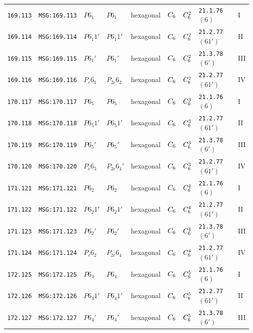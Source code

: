 \documentclass[fleqn,10pt]{jsarticle}
\begin{document}
\begin{center}
\begin{longtable}{lllllllll}
\texttt{169.113} & \texttt{MSG:169.113} & $P6_{1}$ & $P6_{1}$ & hexagonal & $C_{\rm 6}$ & $C_{\rm 6}^{2}$ & \texttt{21.1.76} $(6)$ & I \\
\texttt{169.114} & \texttt{MSG:169.114} & $P6_{1}1'$ & $P6_{1}1'$ & hexagonal & $C_{\rm 6}$ & $C_{\rm 6}^{2}$ & \texttt{21.2.77} $(61')$ & II \\
\texttt{169.115} & \texttt{MSG:169.115} & $P6_{1}'$ & $P6_{1}'$ & hexagonal & $C_{\rm 6}$ & $C_{\rm 6}^{2}$ & \texttt{21.3.78} $(6')$ & III \\
\texttt{169.116} & \texttt{MSG:169.116} & $P_{c}6_{1}$ & $P_{2c}6_{2}$ & hexagonal & $C_{\rm 6}$ & $C_{\rm 6}^{2}$ & \texttt{21.2.77} $(61')$ & IV \\ \hline
\texttt{170.117} & \texttt{MSG:170.117} & $P6_{5}$ & $P6_{5}$ & hexagonal & $C_{\rm 6}$ & $C_{\rm 6}^{3}$ & \texttt{21.1.76} $(6)$ & I \\
\texttt{170.118} & \texttt{MSG:170.118} & $P6_{5}1'$ & $P6_{5}1'$ & hexagonal & $C_{\rm 6}$ & $C_{\rm 6}^{3}$ & \texttt{21.2.77} $(61')$ & II \\
\texttt{170.119} & \texttt{MSG:170.119} & $P6_{5}'$ & $P6_{5}'$ & hexagonal & $C_{\rm 6}$ & $C_{\rm 6}^{3}$ & \texttt{21.3.78} $(6')$ & III \\
\texttt{170.120} & \texttt{MSG:170.120} & $P_{c}6_{5}$ & $P_{2c}6_{4}'$ & hexagonal & $C_{\rm 6}$ & $C_{\rm 6}^{3}$ & \texttt{21.2.77} $(61')$ & IV \\ \hline
\texttt{171.121} & \texttt{MSG:171.121} & $P6_{2}$ & $P6_{2}$ & hexagonal & $C_{\rm 6}$ & $C_{\rm 6}^{4}$ & \texttt{21.1.76} $(6)$ & I \\
\texttt{171.122} & \texttt{MSG:171.122} & $P6_{2}1'$ & $P6_{2}1'$ & hexagonal & $C_{\rm 6}$ & $C_{\rm 6}^{4}$ & \texttt{21.2.77} $(61')$ & II \\
\texttt{171.123} & \texttt{MSG:171.123} & $P6_{2}'$ & $P6_{2}'$ & hexagonal & $C_{\rm 6}$ & $C_{\rm 6}^{4}$ & \texttt{21.3.78} $(6')$ & III \\
\texttt{171.124} & \texttt{MSG:171.124} & $P_{c}6_{2}$ & $P_{2c}6_{4}$ & hexagonal & $C_{\rm 6}$ & $C_{\rm 6}^{4}$ & \texttt{21.2.77} $(61')$ & IV \\ \hline
\texttt{172.125} & \texttt{MSG:172.125} & $P6_{4}$ & $P6_{4}$ & hexagonal & $C_{\rm 6}$ & $C_{\rm 6}^{5}$ & \texttt{21.1.76} $(6)$ & I \\
\texttt{172.126} & \texttt{MSG:172.126} & $P6_{4}1'$ & $P6_{4}1'$ & hexagonal & $C_{\rm 6}$ & $C_{\rm 6}^{5}$ & \texttt{21.2.77} $(61')$ & II \\
\texttt{172.127} & \texttt{MSG:172.127} & $P6_{4}'$ & $P6_{4}'$ & hexagonal & $C_{\rm 6}$ & $C_{\rm 6}^{5}$ & \texttt{21.3.78} $(6')$ & III \\

\end{longtable}
\end{center}
\end{document}
